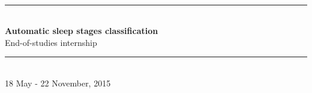 \documentclass[12pt]{report}
\begin{document}
\begin{titlepage}

\newcommand{\HRule}{\rule{\linewidth}{0.5mm}} %

\center %
 


%
\hfill
{}%
\\[2cm]


\HRule \\[0.4cm]
{ \LARGE \bfseries Automatic sleep stages classification}\\[0.3cm] %
{ \large End-of-studies internship}\\[0.3cm] %
\HRule \\[1cm]
 
 
 {\large 18 May - 22 November, 2015}\\[1cm] %
 
  

\end{titlepage}
\end{document}
